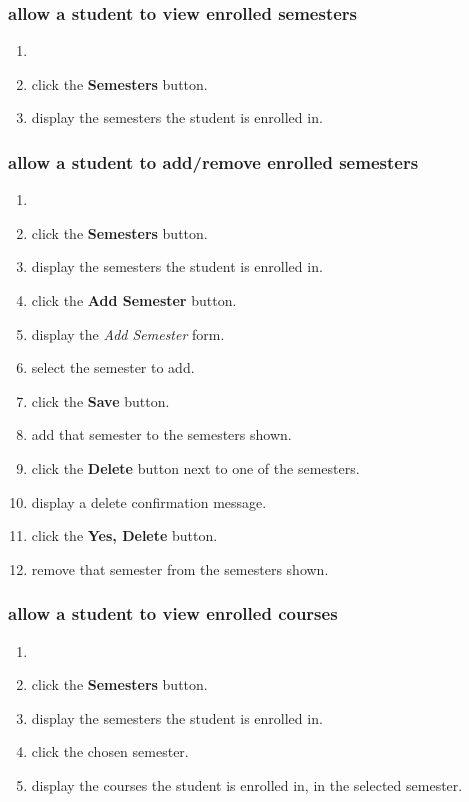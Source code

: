 \documentclass[12pt]{article}
\newenvironment{requirement}[1]
{
    \renewcommand{\thesubsubsection}{R\arabic{subsubsection}.}
    \renewcommand{\labelenumi}{
        \arabic{subsubsection}.\arabic{enumi}
    }
    \renewcommand{\labelenumii}{
        \arabic{subsubsection}.\arabic{enumi}.\arabic{enumii}
    }
    \renewcommand{\labelenumiii}{
        \arabic{subsubsection}.\arabic{enumi}.\arabic{enumii}.\arabic{enumiii}
    }
    \renewcommand{\labelenumiv}{
        \arabic{subsubsection}.\arabic{enumi}.\arabic{enumii}.\arabic{enumiii}.\arabic{enumiv}
    }
    \subsubsection{#1}
    \begin{enumerate}
}
{
    \end{enumerate}
}
\begin{document}
\newcommand{\navsemesters}{
    \item \mainmenu
    \item \stushall click the \textbf{Semesters} button.
    \item \sysshall display the semesters the student is enrolled in.
}

\begin{requirement}{\sysshall allow a student to view enrolled semesters}
    \navsemesters
    \gotohome
\end{requirement}

\begin{requirement}{\sysshall allow a student to add/remove enrolled semesters}
    \navsemesters
    \item \stushall click the \textbf{Add Semester} button.
    \item \sysshall display the \emph{Add Semester} form.
    \item \stushall select the semester to add.
    \item \stushall click the \textbf{Save} button.
    \item \sysshall add that semester to the semesters shown.
    \item \stushall click the \textbf{Delete} button next to one of the semesters.
    \item \sysshall display a delete confirmation message.
    \item \stushall click the \textbf{Yes, Delete} button.
    \item \sysshall remove that semester from the semesters shown.
    \gotohome
\end{requirement}

\newcommand{\navcourses}{
    \navsemesters
    \item \stushall click the chosen semester.
    \item \sysshall display the courses the student is enrolled in, in the selected semester.
}

\begin{requirement}{\sysshall allow a student to view enrolled courses}
    \navcourses
    \gotohome
\end{requirement}
\end{document}
